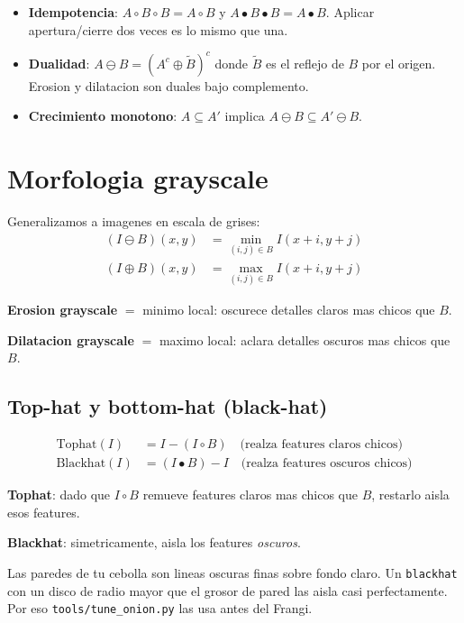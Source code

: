 \documentclass[11pt,a4paper,twoside,openright]{book}
\begin{document}
\begin{itemize}[leftmargin=2em]
  \item \textbf{Idempotencia}: $A \circ B \circ B = A \circ B$ y $A \bullet B \bullet B = A \bullet B$. Aplicar apertura/cierre dos veces es lo mismo que una.
  \item \textbf{Dualidad}: $A \ominus B = (A^c \oplus \tilde{B})^c$ donde $\tilde{B}$ es el reflejo de $B$ por el origen. Erosion y dilatacion son duales bajo complemento.
  \item \textbf{Crecimiento monotono}: $A \subseteq A'$ implica $A \ominus B \subseteq A' \ominus B$.
\end{itemize}

\section{Morfologia grayscale}

Generalizamos a imagenes en escala de grises:
\begin{align}
(I \ominus B)(x,y) &= \min_{(i,j) \in B} I(x+i, y+j) \\
(I \oplus B)(x,y) &= \max_{(i,j) \in B} I(x+i, y+j)
\end{align}

\textbf{Erosion grayscale} $=$ minimo local: oscurece detalles claros mas chicos que $B$.

\textbf{Dilatacion grayscale} $=$ maximo local: aclara detalles oscuros mas chicos que $B$.

\subsection{Top-hat y bottom-hat (black-hat)}

\begin{align}
\mathrm{Tophat}(I) &= I - (I \circ B) \quad \text{(realza features claros chicos)} \\
\mathrm{Blackhat}(I) &= (I \bullet B) - I \quad \text{(realza features oscuros chicos)}
\end{align}

\textbf{Tophat}: dado que $I \circ B$ remueve features claros mas chicos que $B$, restarlo aisla esos features.

\textbf{Blackhat}: simetricamente, aisla los features \emph{oscuros}.

\begin{intuibox}
Las paredes de tu cebolla son lineas oscuras finas sobre fondo claro. Un \texttt{blackhat} con un disco de radio mayor que el grosor de pared las aisla casi perfectamente. Por eso \texttt{tools/tune\_onion.py} las usa antes del Frangi.
\end{intuibox}
\end{document}
